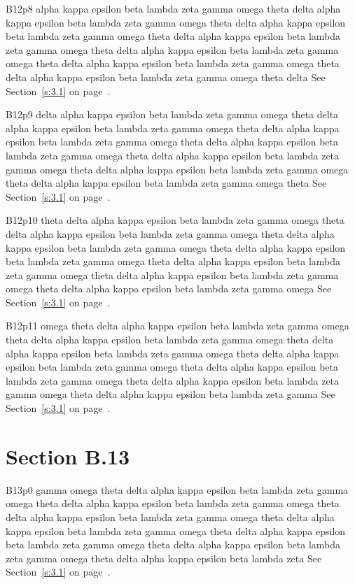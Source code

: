 B12p8 alpha kappa epsilon beta lambda zeta gamma omega theta delta alpha kappa epsilon beta lambda zeta gamma omega theta delta alpha kappa epsilon beta lambda zeta gamma omega theta delta alpha kappa epsilon beta lambda zeta gamma omega theta delta alpha kappa epsilon beta lambda zeta gamma omega theta delta alpha kappa epsilon beta lambda zeta gamma omega theta delta alpha kappa epsilon beta lambda zeta gamma omega theta delta See Section~\ref{s:3.1} on page~\pageref{s:3.1}.

B12p9 delta alpha kappa epsilon beta lambda zeta gamma omega theta delta alpha kappa epsilon beta lambda zeta gamma omega theta delta alpha kappa epsilon beta lambda zeta gamma omega theta delta alpha kappa epsilon beta lambda zeta gamma omega theta delta alpha kappa epsilon beta lambda zeta gamma omega theta delta alpha kappa epsilon beta lambda zeta gamma omega theta delta alpha kappa epsilon beta lambda zeta gamma omega theta See Section~\ref{s:3.1} on page~\pageref{s:3.1}.

B12p10 theta delta alpha kappa epsilon beta lambda zeta gamma omega theta delta alpha kappa epsilon beta lambda zeta gamma omega theta delta alpha kappa epsilon beta lambda zeta gamma omega theta delta alpha kappa epsilon beta lambda zeta gamma omega theta delta alpha kappa epsilon beta lambda zeta gamma omega theta delta alpha kappa epsilon beta lambda zeta gamma omega theta delta alpha kappa epsilon beta lambda zeta gamma omega See Section~\ref{s:3.1} on page~\pageref{s:3.1}.

B12p11 omega theta delta alpha kappa epsilon beta lambda zeta gamma omega theta delta alpha kappa epsilon beta lambda zeta gamma omega theta delta alpha kappa epsilon beta lambda zeta gamma omega theta delta alpha kappa epsilon beta lambda zeta gamma omega theta delta alpha kappa epsilon beta lambda zeta gamma omega theta delta alpha kappa epsilon beta lambda zeta gamma omega theta delta alpha kappa epsilon beta lambda zeta gamma See Section~\ref{s:3.1} on page~\pageref{s:3.1}.

\section{Section B.13}\label{s:B.13}
B13p0 gamma omega theta delta alpha kappa epsilon beta lambda zeta gamma omega theta delta alpha kappa epsilon beta lambda zeta gamma omega theta delta alpha kappa epsilon beta lambda zeta gamma omega theta delta alpha kappa epsilon beta lambda zeta gamma omega theta delta alpha kappa epsilon beta lambda zeta gamma omega theta delta alpha kappa epsilon beta lambda zeta gamma omega theta delta alpha kappa epsilon beta lambda zeta See Section~\ref{s:3.1} on page~\pageref{s:3.1}.

